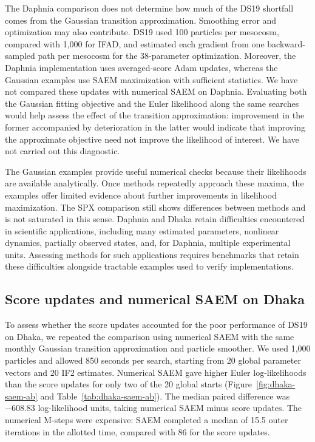 \documentclass[11pt]{article}
\theoremstyle{thmstylethree}%
\begin{document}
The Daphnia comparison does not determine how much of the DS19 shortfall
comes from the Gaussian transition approximation. Smoothing error and
optimization may also contribute. DS19 used 100 particles per mesocosm,
compared with 1,000 for IFAD, and estimated each gradient from one
backward-sampled path per mesocosm for the 38-parameter optimization.
Moreover, the Daphnia implementation uses averaged-score Adam updates,
whereas the Gaussian examples use SAEM maximization with sufficient
statistics. We have not compared these updates with numerical SAEM on
Daphnia. Evaluating both the Gaussian fitting objective and the Euler
likelihood along the same searches would help assess the effect of the
transition approximation: improvement in the former accompanied by
deterioration in the latter would indicate that improving the approximate
objective need not improve the likelihood of interest. We have not
carried out this diagnostic.

The Gaussian examples provide useful numerical checks because their
likelihoods are available analytically. Once methods repeatedly approach
these maxima, the examples offer limited evidence about further
improvements in likelihood maximization. The SPX comparison still shows
differences between methods and is not saturated in this sense.
Daphnia and Dhaka retain difficulties encountered in scientific
applications, including many estimated parameters, nonlinear dynamics,
partially observed states, and, for Daphnia, multiple experimental units.
Assessing methods for such applications requires benchmarks that retain
these difficulties alongside tractable examples used to verify implementations.

\subsection{Score updates and numerical SAEM on Dhaka}

To assess whether the score updates accounted for the poor performance
of DS19 on Dhaka, we repeated the comparison using numerical SAEM with
the same monthly Gaussian transition approximation and particle smoother.
We used 1,000 particles and allowed 850 seconds per search, starting
from 20 global parameter vectors and 20 IF2 estimates.
Numerical SAEM gave higher Euler log-likelihoods than the score updates
for only two of the 20 global starts
(Figure~\ref{fig:dhaka-saem-ab} and Table~\ref{tab:dhaka-saem-ab}).
The median paired difference was $-608.83$ log-likelihood units, taking
numerical SAEM minus score updates. The numerical M-steps were expensive:
SAEM completed a median of 15.5 outer iterations in the allotted time,
compared with 86 for the score updates.
\end{document}

